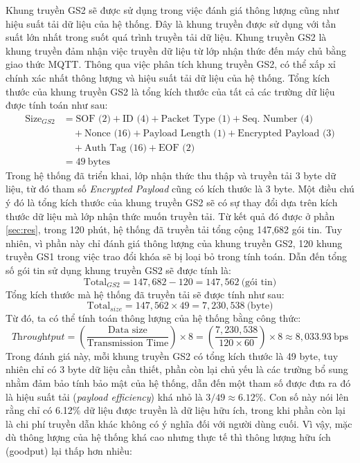 Khung truyền GS2 sẽ được sử dụng trong việc đánh giá thông lượng cũng như hiệu suất tải dữ liệu của hệ thống. Đây là khung truyền được sử dụng với tần suất lớn nhất trong suốt quá trình truyền tải dữ liệu. Khung truyền GS2 là khung truyền đảm nhận việc truyền dữ liệu từ lớp nhận thức đến máy chủ bằng giao thức MQTT. Thông qua việc phân tích khung truyền GS2, có thể xấp xỉ chính xác nhất thông lượng và hiệu suất tải dữ liệu của hệ thống. Tổng kích thước của khung truyền GS2 là tổng kích thước của tất cả các trường dữ liệu được tính toán như sau:
\begin{align*}
\text{Size}_{GS2} &= \text{SOF (2)} + \text{ID (4)} + \text{Packet Type (1)} + \text{Seq. Number (4)} \\
& \quad + \text{Nonce (16)} + \text{Payload Length (1)} + \text{Encrypted Payload (3)} \\
& \quad + \text{Auth Tag (16)} + \text{EOF (2)} \\
&= 49\ \text{bytes}
\end{align*}
Trong hệ thống đã triển khai, lớp nhận thức thu thập và truyền tải 3 byte dữ liệu, từ đó tham số \textit{Encrypted Payload} cũng có kích thước là 3 byte. Một điều chú ý đó là tổng kích thước của khung truyền GS2 sẽ có sự thay đổi dựa trên kích thước dữ liệu mà lớp nhận thức muốn truyền tải. Từ kết quả đó được ở phần \ref{sec:res}, trong 120 phút, hệ thống đã truyền tải tổng cộng 147,682 gói tin. Tuy nhiên, vì phần này chỉ đánh giá thông lượng của khung truyền GS2, 120 khung truyền GS1 trong việc trao đổi khóa sẽ bị loại bỏ trong tính toán. Dẫn đến tổng số gói tin sử dụng khung truyền GS2 sẽ được tính là:
\[
\text{Total}_{GS2} = 147,682 - 120 = 147,562 \ \text{(gói tin)}
\]
Tổng kích thước mà hệ thống đã truyền tải sẽ được tính như sau:
\[
\text{Total}_{size} = 147,562 \times 49 = 7,230,538 \ \text{(byte)}
\]
Từ đó, ta có thể tính toán thông lượng của hệ thống bằng công thức:
\[
\textit{Throughtput} = \left( \frac{\text{Data size}}{\text{Transmission Time}} \right) \times 8 = \left( \frac{7,230,538}{120 \times 60} \right) \times 8 \approx 8,033.93 \ \text{bps}
\]
Trong đánh giá này, mỗi khung truyền GS2 có tổng kích thước là 49 byte, tuy nhiên chỉ có 3 byte dữ liệu cần thiết, phần còn lại chủ yếu là các trường bổ sung nhằm đảm bảo tính bảo mật của hệ thống, dẫn đến một tham số được đưa ra đó là hiệu suất tải (\textit{payload efficiency}) khá nhỏ là $3/49 \approx 6.12\%$. Con số này nói lên rằng chỉ có 6.12\% dữ liệu được truyền là dữ liệu hữu ích, trong khi phần còn lại là chi phí truyền dẫn khác không có ý nghĩa đối với người dùng cuối. Vì vậy, mặc dù thông lượng của hệ thống khá cao nhưng thực tế thì thông lượng hữu ích (goodput) lại thấp hơn nhiều:
